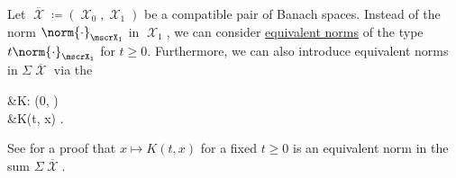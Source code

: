 \begin{definition}\label{def:k_functional}\mcite\cite[38]{Bergh1976}
  Let \( \overline{\mscrX} \coloneqq ( \mscrX_0, \mscrX_1 ) \) be a compatible pair of Banach spaces. Instead of the norm \( \norm{\cdot}_{\mscrX_1} \) in \( \mscrX_1 \), we can consider \hyperref[def:equivalent_metrics]{equivalent norms} of the type \( t\norm{\cdot}_{\mscrX_1} \) for \( t \geq 0 \). Furthermore, we can also introduce equivalent norms in \( \Sigma \overline{\mscrX} \) via the 
  \begin{alignedeq}\label{eq:def:k_functional}
    &K: (0, \infty) \times {\Sigma \overline{\mscrX}} \\
    &K(t, x) \coloneqq \inf {}.
  \end{alignedeq}

  See  for a proof that \( x \mapsto K(t, x) \) for a fixed \( t \geq 0 \) is an equivalent norm in the sum \( \Sigma \overline{\mscrX} \).
\end{definition}

